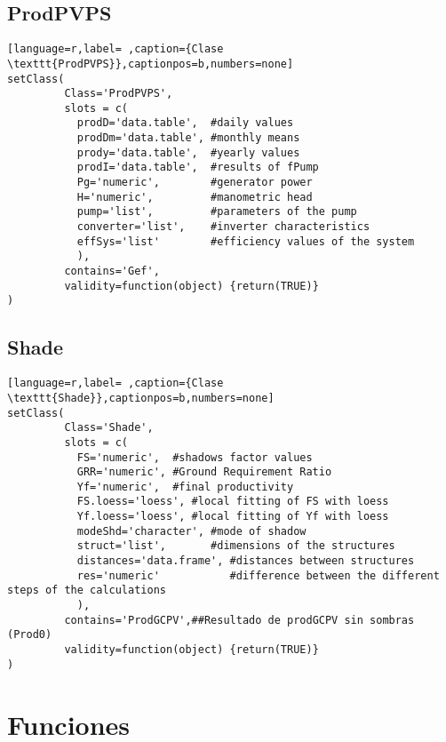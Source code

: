 \subsection{ProdPVPS}
\label{sec:org59d471e}
\label{subsec:claseprodpvps}
\begin{lstlisting}[language=r,label= ,caption={Clase \texttt{ProdPVPS}},captionpos=b,numbers=none]
setClass(
         Class='ProdPVPS',
         slots = c(
           prodD='data.table',  #daily values
           prodDm='data.table', #monthly means
           prody='data.table',  #yearly values
           prodI='data.table',  #results of fPump
           Pg='numeric',        #generator power
           H='numeric',         #manometric head
           pump='list',         #parameters of the pump
           converter='list',    #inverter characteristics
           effSys='list'        #efficiency values of the system
           ),
         contains='Gef',
         validity=function(object) {return(TRUE)}
)
\end{lstlisting}
\subsection{Shade}
\label{sec:orgc307530}
\label{subsec:shade}
\begin{lstlisting}[language=r,label= ,caption={Clase \texttt{Shade}},captionpos=b,numbers=none]
setClass(
         Class='Shade',
         slots = c(
           FS='numeric',  #shadows factor values
           GRR='numeric', #Ground Requirement Ratio
           Yf='numeric',  #final productivity
           FS.loess='loess', #local fitting of FS with loess
           Yf.loess='loess', #local fitting of Yf with loess
           modeShd='character', #mode of shadow
           struct='list',       #dimensions of the structures
           distances='data.frame', #distances between structures
           res='numeric'           #difference between the different steps of the calculations
           ),
         contains='ProdGCPV',##Resultado de prodGCPV sin sombras (Prod0)
         validity=function(object) {return(TRUE)}
)
\end{lstlisting}
\section{Funciones}
\label{sec:orgbe3a575}
\label{sec:funciones}
